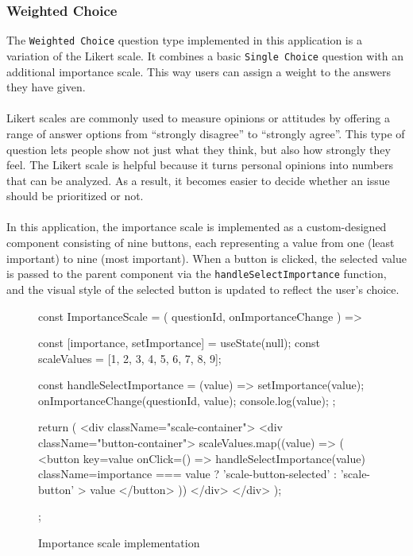 \documentclass[a4paper,12pt]{report}
\begin{document}
\subsubsection{Weighted Choice}
The \texttt{Weighted Choice} question type implemented in this application is a variation of the Likert scale. It combines a basic \texttt{Single Choice} question with an additional importance scale. This way users can assign a weight to the answers they have given. \\\\
Likert scales are commonly used to measure opinions or attitudes by offering a range of answer options from “strongly disagree” to “strongly agree”. This type of question lets people show not just what they think, but also how strongly they feel. The Likert scale is helpful because it turns personal opinions into numbers that can be analyzed. As a result, it becomes easier to decide whether an issue should be prioritized or not. \parencite{likert-scale} \\\\
In this application, the importance scale is implemented as a custom-designed component consisting of nine buttons, each representing a value from one (least important) to nine (most important). When a button is clicked, the selected value is passed to the parent component via the \texttt{handleSelectImportance} function, and the visual style of the selected button is updated to reflect the user’s choice.
\begin{figure}[H]
	\begin{code}
		const ImportanceScale = ({ questionId, onImportanceChange }) => {
			const [importance, setImportance] = useState(null);
			const scaleValues = [1, 2, 3, 4, 5, 6, 7, 8, 9];
			
			const handleSelectImportance = (value) => {
				setImportance(value);
				onImportanceChange(questionId, value);
				console.log(value);
			};
			
			return (
			<div className="scale-container">
			<div className="button-container">
			{scaleValues.map((value) => (
				<button
				key={value}
				onClick={() => handleSelectImportance(value)}
				className={importance === value ? 'scale-button-selected' : 'scale-button'}
				>
				{value}
				</button>
				))}
			</div>
			</div>
			);
		};
	\end{code}
	\caption{Importance scale implementation}
	\label{fig:importance-scale}
\end{figure} 
\end{document}
